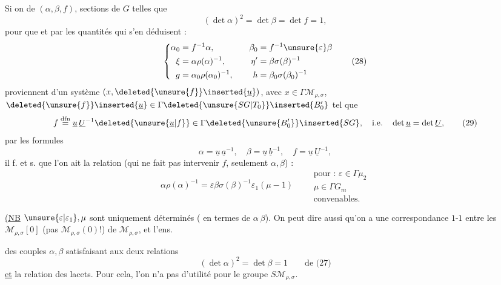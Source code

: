 Si on  de $(\alpha,\beta,f)$\deleted{$\unsure{\in}$}, sections de $G$ telles que
\[
(\det\alpha)^2=\det\beta=\det f=1,\tag{27}
\]
pour que   et par  les quantités qui s'en déduisent : 
\[
\left\{
\begin{aligned}
\alpha_0&=f^{-1}\alpha,&\quad \beta_0&=f^{-1}\unsure{\varepsilon}\beta\\
\xi&=\alpha\rho(\alpha)^{-1},&\quad \eta'&=\beta\sigma(\beta)^{-1}\\
g&=\alpha_0\rho(\alpha_0)^{-1},&\quad h&=\beta_0\sigma(\beta_0)^{-1}
\end{aligned}
\right.\tag{28}
\]
proviennent d'un système $(x,\deleted{\unsure{f}}\inserted{\underline u})$,
avec $x\in\Gamma\mathcal M_{\rho,\sigma}$,
$\deleted{\unsure{f}}\inserted{\underline u}\in\Gamma\deleted{\unsure{SG|T_0}}\inserted{B'_0}$ tel que
\[
f\overset{\mathrm{dfn}}{=}\underline u\,\underline U^{-1}
\deleted{\unsure{\underline u|f}}
\in\Gamma\deleted{\unsure{B'_0}}\inserted{SG},
\quad\text{i.e.}\quad\det\underline u=\det\underline U,
\tag{29}
\]
par les formules
\[
\alpha=\underline u\,\underline a^{-1},\quad
\beta=\underline u\,\underline b^{-1},\quad
f=\underline u\,\underline U^{-1},\tag{30}
\]
il f. et s. que l'on ait la relation (qui ne fait pas intervenir $f$, seulement $\alpha,\beta$) :
\[
\alpha\rho(\alpha)^{-1}=\varepsilon\beta\sigma(\beta)^{-1}\varepsilon_1(\mu-1)
\qquad
\begin{gathered}
\text{pour : }\varepsilon\in\Gamma\mu_2\\
\mu\in\Gamma G_m\\
\text{convenables.}
\end{gathered}\tag{31}
\]

\uline{(NB} $\unsure{\varepsilon|\varepsilon_1},\mu$ sont uniquement déterminés ( en termes de $\alpha\ \beta$).
On peut dire  aussi qu'on a une correspondance $1$-$1$ entre les   $\mathcal M_{\rho,\sigma}[0]$ (pas $\mathcal M_{\rho,\sigma}(0)$!) de $\mathcal M_{\rho,\sigma}$, et l'ens.



des couples $\alpha,\beta$ satisfaisant aux deux relations
\[
(\det\alpha)^2=\det\beta=1\qquad\text{de (27)}
\]
\uline{et} la relation des lacets. Pour cela, l'on n'a  pas d'utilité pour le groupe $S\mathcal M_{\rho,\sigma}$.


